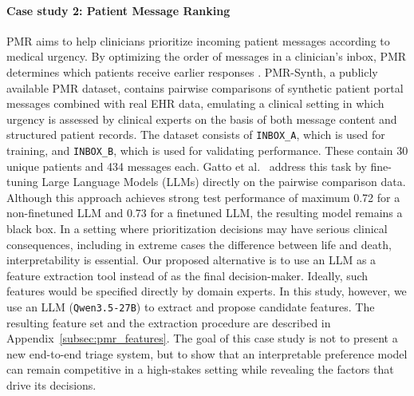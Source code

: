 \documentclass{article}
\begin{document}
\paragraph{Case study 2: Patient Message Ranking}
PMR aims to help clinicians prioritize incoming patient messages according to medical urgency. By optimizing the order of messages in a clinician’s inbox, PMR determines which patients receive earlier responses \cite{gatto2026medicaltriagepairwiseranking}. PMR-Synth, a publicly available PMR dataset, contains pairwise comparisons of synthetic patient portal messages combined with real EHR data, emulating a clinical setting in which urgency is assessed by clinical experts on the basis of both message content and structured patient records. The dataset consists of \texttt{INBOX\_A}, which is used for training, and \texttt{INBOX\_B}, which is used for validating performance. These contain 30 unique patients and 434 messages each. Gatto et al.~\cite{gatto2026medicaltriagepairwiseranking} address this task by fine-tuning Large Language Models (LLMs) directly on the pairwise comparison data. Although this approach achieves strong test performance of maximum 0.72 for a non-finetuned LLM and 0.73 for a finetuned LLM, the resulting model remains a black box. In a setting where prioritization decisions may have serious clinical consequences, including in extreme cases the difference between life and death, interpretability is essential.
Our proposed alternative is to use an LLM as a feature extraction tool instead of as the final decision-maker. 
Ideally, such features would be specified directly by domain experts. In this study, however, we use an LLM (\texttt{Qwen3.5-27B}) to extract and propose candidate features. The resulting feature set and the extraction procedure are described in Appendix~\ref{subsec:pmr_features}. The goal of this case study is not to present a new end-to-end triage system, but to show that an interpretable preference model can remain competitive in a high-stakes setting while revealing the factors that drive its decisions.
\end{document}
